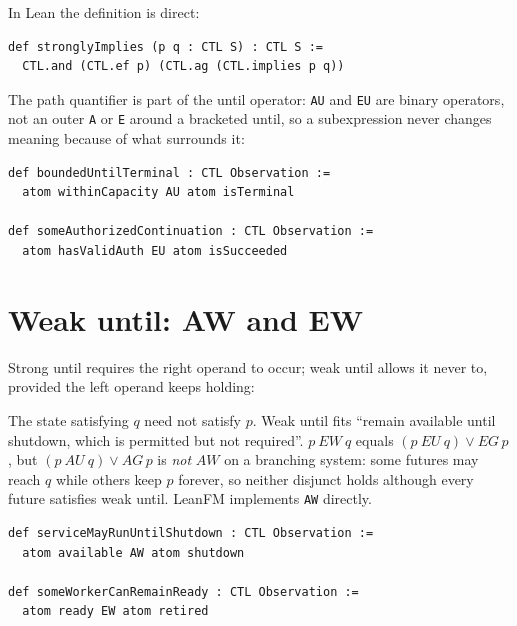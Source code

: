 In Lean the definition is direct:

\begin{lstlisting}
def stronglyImplies (p q : CTL S) : CTL S :=
  CTL.and (CTL.ef p) (CTL.ag (CTL.implies p q))
\end{lstlisting}

The path quantifier is part of the until operator: \texttt{AU} and \texttt{EU} are
binary operators, not an outer \texttt{A} or \texttt{E} around a bracketed until, so
a subexpression never changes meaning because of what surrounds it:

\begin{lstlisting}
def boundedUntilTerminal : CTL Observation :=
  atom withinCapacity AU atom isTerminal

def someAuthorizedContinuation : CTL Observation :=
  atom hasValidAuth EU atom isSucceeded
\end{lstlisting}

\section{Weak until: AW and EW}

Strong until requires the right operand to occur; weak until allows it never to,
provided the left operand keeps holding:


The state satisfying $q$ need not satisfy $p$. Weak until fits ``remain available
until shutdown, which is permitted but not required''. $p\ EW\ q$ equals
$(p\ EU\ q)\lor EG\,p$, but $(p\ AU\ q)\lor AG\,p$ is \emph{not} $AW$ on a
branching system: some futures may reach $q$ while others keep $p$ forever, so
neither disjunct holds although every future satisfies weak until. LeanFM
implements \texttt{AW} directly.

\begin{lstlisting}
def serviceMayRunUntilShutdown : CTL Observation :=
  atom available AW atom shutdown

def someWorkerCanRemainReady : CTL Observation :=
  atom ready EW atom retired
\end{lstlisting}

